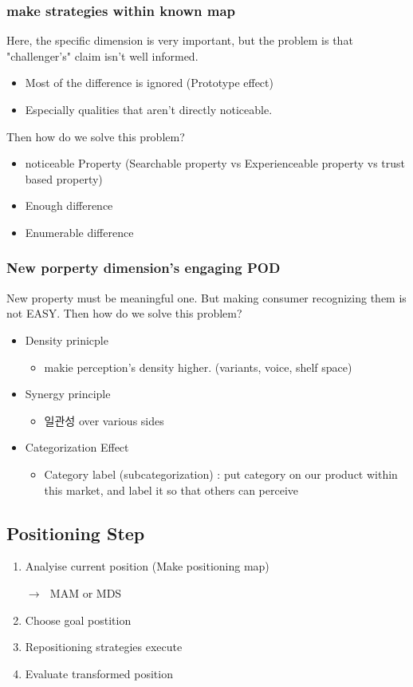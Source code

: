 \documentclass[12pt]{article}
\newcommand{\ra}{$\rightarrow \text{ }$}
\begin{document}
\subsubsection{make strategies within known map}
Here, the specific dimension is very important, but the problem is that "challenger's" claim isn't well informed.
\begin{itemize}
	\item Most of the difference is ignored (Prototype effect)
	\item Especially qualities that aren't directly noticeable.
\end{itemize}
Then how do we solve this problem?
\begin{itemize}
	\item noticeable Property (Searchable property vs Experienceable property vs trust based property)
	\item Enough difference
	\item Enumerable difference
\end{itemize}

\subsubsection{New porperty dimension's engaging POD}
New property must be meaningful one.
But making consumer recognizing them is not EASY. Then how do we solve this problem?
\begin{itemize}
	\item Density prinicple
	\begin{itemize}
		\item makie perception's density higher. (variants, voice, shelf space)
	\end{itemize}
	\item Synergy principle
	\begin{itemize}
		\item 일관성 over various sides
	\end{itemize}
	\item Categorization Effect
	\begin{itemize}
		\item Category label (subcategorization) : put category on our product within this market, and label it so that others can perceive
	\end{itemize}
\end{itemize}

\subsection{Positioning Step}
\begin{center}
\begin{enumerate}
	\item Analyise current position (Make positioning map)

	\ra MAM or MDS
	\item Choose goal postition
	\item Repositioning strategies execute
	\item Evaluate transformed position
\end{enumerate}

\end{center}
\end{document}
